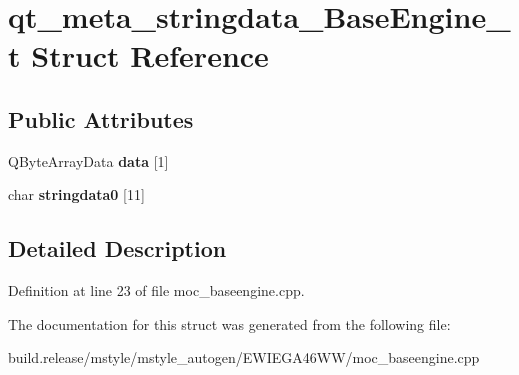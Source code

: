 \hypertarget{structqt__meta__stringdata___base_engine__t}{}\section{qt\+\_\+meta\+\_\+stringdata\+\_\+\+Base\+Engine\+\_\+t Struct Reference}
\label{structqt__meta__stringdata___base_engine__t}
\subsection*{Public Attributes}
\begin{DoxyCompactItemize}
\item 
\mbox{\label{structqt__meta__stringdata___base_engine__t_af856b19ab62c383d56f75c59ab22a22d}} 
Q\+Byte\+Array\+Data {\bfseries data} \mbox{[}1\mbox{]}
\item 
\mbox{\label{structqt__meta__stringdata___base_engine__t_a22c2bdbe5eb9af6116ae7df26500f193}} 
char {\bfseries stringdata0} \mbox{[}11\mbox{]}
\end{DoxyCompactItemize}


\subsection{Detailed Description}


Definition at line 23 of file moc\+\_\+baseengine.\+cpp.



The documentation for this struct was generated from the following file\+:\begin{DoxyCompactItemize}
\item 
build.\+release/mstyle/mstyle\+\_\+autogen/\+E\+W\+I\+E\+G\+A46\+W\+W/moc\+\_\+baseengine.\+cpp\end{DoxyCompactItemize}
